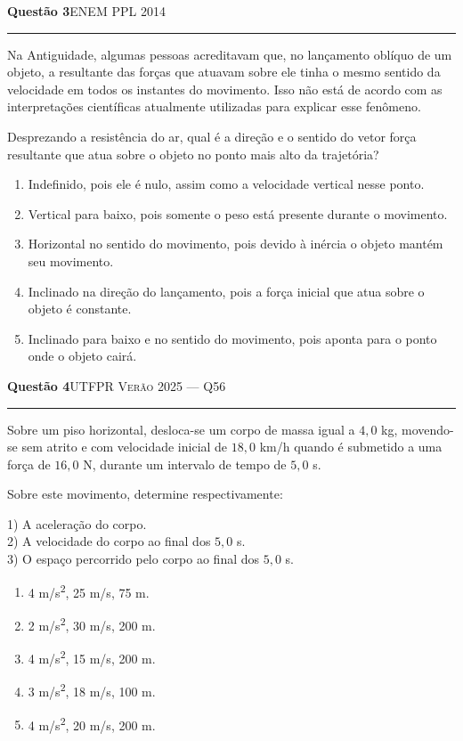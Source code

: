 \documentclass[11pt,a4paper]{article}
\newcommand{\fonte}[1]{{\small\scshape\color{grafite}#1}}
\newenvironment{questao}[2]{%
  \needspace{6\baselineskip}
  \par\addvspace{1.6em}
  {\large\bfseries\color{vinho}Quest\~ao #1}\hfill #2\\[-0.55em]
  {\color{black!25}\rule{\linewidth}{0.4pt}}
  \par\nobreak\smallskip
}{\par\addvspace{0.4em}}
\begin{document}
\begin{questao}{3}{\fonte{ENEM PPL 2014}}
Na Antiguidade, algumas pessoas acreditavam que, no lan\c{c}amento
obl\'iquo de um objeto, a resultante das for\c{c}as que atuavam sobre
ele tinha o mesmo sentido da velocidade em todos os instantes do
movimento. Isso n\~ao est\'a de acordo com as interpreta\c{c}\~oes
cient\'ificas atualmente utilizadas para explicar esse fen\^omeno.

Desprezando a resist\^encia do ar, qual \'e a dire\c{c}\~ao e o sentido
do vetor for\c{c}a resultante que atua sobre o objeto no ponto mais alto
da trajet\'oria?
\begin{enumerate}
  \item Indefinido, pois ele \'e nulo, assim como a velocidade vertical
        nesse ponto.
  \item Vertical para baixo, pois somente o peso est\'a presente durante
        o movimento.
  \item Horizontal no sentido do movimento, pois devido \`a in\'ercia o
        objeto mant\'em seu movimento.
  \item Inclinado na dire\c{c}\~ao do lan\c{c}amento, pois a for\c{c}a
        inicial que atua sobre o objeto \'e constante.
  \item Inclinado para baixo e no sentido do movimento, pois aponta para
        o ponto onde o objeto cair\'a.
\end{enumerate}
\end{questao}

\begin{questao}{4}{\fonte{UTFPR Ver\~ao 2025 --- Q56}}
Sobre um piso horizontal, desloca-se um corpo de massa igual a
$4{,}0$ kg, movendo-se sem atrito e com velocidade inicial de
$18{,}0$ km/h quando \'e submetido a uma for\c{c}a de $16{,}0$ N,
durante um intervalo de tempo de $5{,}0$ s.

Sobre este movimento, determine respectivamente:

1) A acelera\c{c}\~ao do corpo.\\
2) A velocidade do corpo ao final dos $5{,}0$ s.\\
3) O espa\c{c}o percorrido pelo corpo ao final dos $5{,}0$ s.
\begin{enumerate}
  \item 4 m/s\textsuperscript{2}, 25 m/s, 75 m.
  \item 2 m/s\textsuperscript{2}, 30 m/s, 200 m.
  \item 4 m/s\textsuperscript{2}, 15 m/s, 200 m.
  \item 3 m/s\textsuperscript{2}, 18 m/s, 100 m.
  \item 4 m/s\textsuperscript{2}, 20 m/s, 200 m.
\end{enumerate}
\end{questao}
\end{document}

